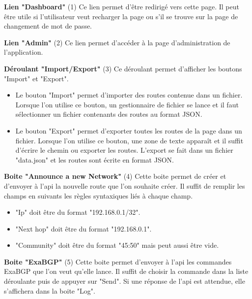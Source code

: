 \newpage
\textbf{Lien "Dashboard"} (1)\newline
Ce lien permet d'être redirigé vers cette page. Il peut être utile si l'utilisateur veut recharger la page ou s'il se trouve sur la page de changement de mot de passe.\newline

\textbf{Lien "Admin"} (2)\newline
Ce lien permet d'accéder à la page d'administration de l'application.\newline

\textbf{Déroulant "Import/Export"} (3)\newline
Ce déroulant permet d'afficher les boutons "Import" et "Export".
\begin{itemize}
    \item Le bouton "Import" permet d'importer des routes contenue dans un fichier. Lorsque l'on utilise ce bouton, un gestionnaire de fichier se lance et il faut sélectionner un fichier contenants des routes au format JSON.
    \item Le bouton "Export" permet d'exporter toutes les routes de la page dans un fichier. Lorsque l'on utilise ce bouton, une zone de texte apparaît et il suffit d'écrire le chemin ou exporter les routes. L'export se fait dans un fichier "data.json" et les routes sont écrite en format JSON.\newline
\end{itemize}

\textbf{Boite "Announce a new Network"} (4)\newline
Cette boite permet de créer et d'envoyer à l'api la nouvelle route que l'on souhaite créer. Il suffit de remplir les champs en suivants les règles syntaxiques liés à chaque champ.
\begin{itemize}
    \item "Ip" doit être du format "192.168.0.1/32".
    \item "Next hop" doit être du format "192.168.0.1".
    \item "Community" doit être du format "45:50" mais peut aussi être vide.\newline
\end{itemize}

\textbf{Boite "ExaBGP"} (5)\newline
Cette boite permet d'envoyer à l'api les commandes ExaBGP que l'on veut qu'elle lance. Il suffit de choisir la commande dans la liste déroulante puis de appuyer sur "Send". Si une réponse de l'api est attendue, elle s'affichera dans la boite "Log".\newline

